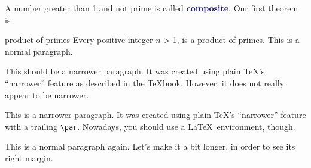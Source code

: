 \documentclass[dvipsnames]{article}
\newcommand{\mycola}{MidnightBlue}
\newcommand{\Cola}[1]{\textcolor{\mycola}{\textbf{#1}}}
\begin{document}
A number greater than 1 and not prime is called \Cola{composite}.
Our first theorem is
\begin{myTheo}{}{product-of-primes}
  Every positive integer $n$ > 1, is a product of primes.
  \tcblower
  This is a normal paragraph.

  {\narrower\smallskip\noindent
    This should be a narrower paragraph.
    It was created using plain \TeX's ``narrower'' feature as described in the \TeX book.
    However, it does not really appear to be narrower.
    \smallskip
  }

  {\narrower\smallskip\noindent
    This is a narrower paragraph.
    It was created using plain \TeX's ``narrower'' feature with a trailing \verb|\par|.
    Nowadays, you should use a \LaTeX\ environment, though.
    \par\smallskip
  }

  This is a normal paragraph again.
  Let's make it a bit longer, in order to see its right margin.
\end{myTheo}
\end{document}
